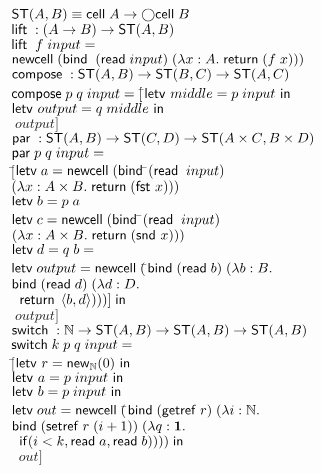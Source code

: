 \documentclass[preprint,natbib]{sigplanconf}
\begin{document}
\begin{figure}
\begin{tabbing}
$\ST{A}{B} \equiv \celltype{A} \to \monad{\celltype{B}}$ \\[1em]

$\liftop : (A \to B) \to \ST{A}{B}$ \\
$\liftop\;f\;input = $ \\
\;\; $\newcell (\bind\;(\readcell input)\; (\fun{x}{A}{\return (f\;x)}))$ \\[1em]

$\composeop : \ST{A}{B} \to \ST{B}{C} \to \ST{A}{C}$ \\
$\composeop p\;q\;input = [$\=$\letv{middle}{p\;input}$ \\
                            \>$\letv{output}{q\;middle}$ \\ 
                            \>$\;output]$ \\[1em]

$\parop : \ST{A}{B} \to \ST{C}{D} \to \ST{A \times C}{B \times D}$ \\
$\parop p \; q \; input = $ \\
\;\;$[$\=$\ctext{letv}\;a = \newcell (\bind$\=$(\readcell\;input)$ \\
     \>                                   \>$(\fun{x}{A\times B}{\return (\fst{x})}))$ \\
     \>$\ctext{letv}\;b = {p\;a}{}$ \\
     \>$\ctext{letv}\;c = \newcell (\bind$\=$(\readcell\;input)\;$\\ 
     \>                                   \>$(\fun{x}{A\times B}{\return (\snd{x})}))$ \\
     \>$\ctext{letv}\;d = {q\;b} = $ \\
     \>$\ctext{letv}\;output = \newcell ($\=$\bind (\readcell b)\; (\lambda b:B.$ \\
     \>                                   \>$\bind (\readcell d)\; (\lambda d:D.$ \\
     \>                                   \>$\;\;\return \pair{b}{d})))] \;\ctext{in}$ \\
     \>$\;output]$ \\[1em]

$\switchop : \N \to \ST{A}{B} \to \ST{A}{B} \to \ST{A}{B}$ \\
$\switchop k\;p\;q\; input =  $ \\
\;\;$[$\=$\letv{r}{\newref{\N}{0}}{}$ \\
    \>$\letv{a}{p\;input}$ \\
    \>$\letv{b}{p\;input}$ \\
    \>$\ctext{letv}\; out = \newcell ($\=$\bind (\getref r) \;(\lambda i:\N.\;$ \\
    \>                                 \>$\bind (\setref r\;(i+1)) \; (\lambda q:\unittype.$ \\
    \>                                 \>$\;\;\ctext{if}(i < k, \readcell a, \readcell b)))) \;\ctext{in}$ \\
    \>$\;\;out]$\\[1em]


\end{tabbing}
\end{figure}
\end{document}
